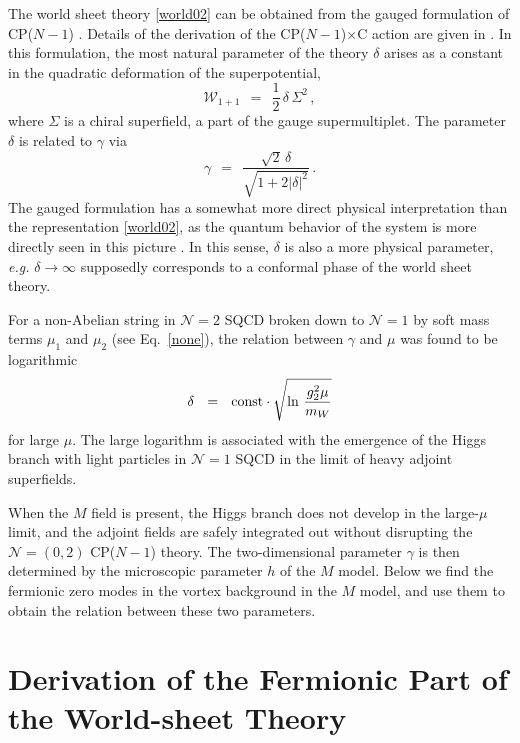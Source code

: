 \documentclass[12pt]{article}
\def\beq{\begin{equation}}
\def\eeq{\end{equation}}
\newcommand{\ntwo}{${\mathcal N}=2$ }
\newcommand{\ntwoo}{${\mathcal N}= \left(0,2\right) $ }
\newcommand{\none}{${\mathcal N}=1$ }
\newcommand{\CPC}{CP($N-1$)$\times$C }
\begin{document}
	The world sheet theory \eqref{world02} can be obtained from the gauged formulation of CP($N-1$) \cite{W93}.
	Details of the derivation of the \CPC action are given in \cite{SYhet,BSYhet}.
	In this formulation, the most natural parameter of the theory $\delta$ arises as 
	a constant in the quadratic deformation of the superpotential,
\[
	\mathcal{W}_{1+1} ~~=~~ \frac{1}{2}\,\delta\,\Sigma^2\,,
\]
	where $\Sigma$ is a chiral superfield, a part of the gauge supermultiplet.
The parameter $ \delta $ is related to $ \gamma $ via
\[
	\gamma ~~=~~ \frac { \sqrt{2}\,\delta } { \sqrt{ 1 +  2 |\delta|^2 } }\,.
\]
	The gauged formulation has a somewhat more direct physical interpretation than
	the representation \eqref{world02}, as the quantum behavior of the system is more directly
	seen in this picture \cite{SYhet2}. 
	In this sense, $ \delta $ is also a more physical parameter, {\it e.g.}
	$ \delta \to \infty $ supposedly corresponds to a conformal phase of the world sheet theory.

	For a non-Abelian string in \ntwo SQCD broken down to \none by soft mass terms $ \mu_1 $ and $ \mu_2 $
	(see Eq.~\eqref{none}), the relation between $ \gamma $ and $ \mu $ was found to be logarithmic \cite{SYhet,BSYhet}
\beq
	\delta ~~=~~ 
	{\rm const} \cdot \sqrt{\ln\, \frac{g_2^2\mu}{m_W}}
\eeq
	for large $ \mu $.
	The large logarithm is associated with the emergence  of the Higgs branch
	with light particles in \none SQCD in the limit of heavy  adjoint superfields.
	

	When the $ M $ field is present, the Higgs branch does not develop in the large-$ \mu $
	limit, and the adjoint
	fields are safely integrated out without disrupting the \ntwoo CP($N-1$) theory.
	The two-dimensional parameter $ \gamma $ is then determined by the microscopic parameter $ h $ of the  $ M $ model. 
	Below we find the fermionic zero modes in the vortex background in the $M$ model,
	and use them to obtain the relation between these two parameters. 
	
%
%
\section{Derivation of the Fermionic Part of the World-sheet Theory}
\setcounter{equation}{0}
\end{document}

